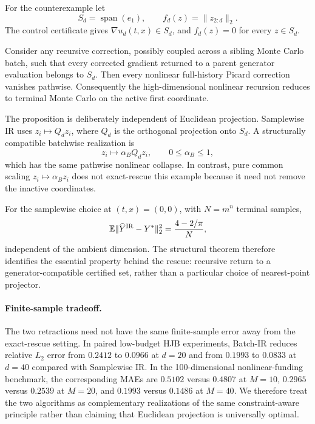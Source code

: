 For the counterexample let
\[
 S_d=\operatorname{span}(e_1),
 \qquad
 f_d(z)=\|z_{2:d}\|_2.
\]
The control certificate gives $\nabla u_d(t,x)\in S_d$, and
$f_d(z)=0$ for every $z\in S_d$.

\begin{proposition}
\label{prop:structural-retraction-rescue}
Consider any recursive correction, possibly coupled across a sibling Monte
Carlo batch, such that every corrected gradient returned to a parent generator
evaluation belongs to $S_d$. Then every nonlinear full-history Picard
correction vanishes pathwise. Consequently the high-dimensional nonlinear
recursion reduces to terminal Monte Carlo on the active first coordinate.
\end{proposition}

The proposition is deliberately independent of Euclidean projection.
Samplewise IR uses $z_i\mapsto Q_dz_i$, where $Q_d$ is the orthogonal
projection onto $S_d$. A structurally compatible batchwise realization is
\[
 z_i\mapsto \alpha_BQ_dz_i,
 \qquad 0\le\alpha_B\le1,
\]
which has the same pathwise nonlinear collapse. In contrast, pure common
scaling $z_i\mapsto\alpha_Bz_i$ does not exact-rescue this example because
it need not remove the inactive coordinates.

For the samplewise choice at $(t,x)=(0,0)$, with $N=m^n$ terminal samples,
\[
 \mathbb E\|\widehat Y^{\rm IR}-Y^*\|_2^2
 =\frac{4-2/\pi}{N},
\]
independent of the ambient dimension. The structural theorem therefore
identifies the essential property behind the rescue: recursive return to a
generator-compatible certified set, rather than a particular choice of
nearest-point projector.

\paragraph{Finite-sample tradeoff.}
The two retractions need not have the same finite-sample error away from the
exact-rescue setting. In paired low-budget HJB experiments, Batch-IR reduces
relative $L_2$ error from $0.2412$ to $0.0966$ at $d=20$ and from $0.1993$
to $0.0833$ at $d=40$ compared with Samplewise IR. In the 100-dimensional
nonlinear-funding benchmark, the corresponding MAEs are $0.5102$ versus
$0.4807$ at $M=10$, $0.2965$ versus $0.2539$ at $M=20$, and $0.1993$
versus $0.1486$ at $M=40$. We therefore treat the two algorithms as
complementary realizations of the same constraint-aware principle rather than
claiming that Euclidean projection is universally optimal.
